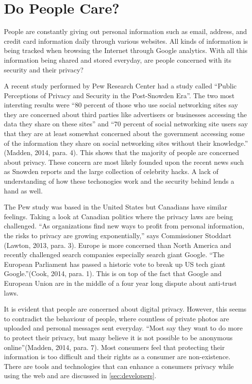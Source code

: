 \documentclass[12pt]{article}
\begin{document}
\section{Do People Care?}\label{sec:demand}

People are constantly giving out personal information such as email, address, and credit card information daily through various websites. All kinds of information is being tracked when browsing the Internet through Google analytics. With all this information being shared and stored everyday, are people concerned with its security and their privacy?

A recent study performed by Pew Research Center had a study called ``Public Perceptions of Privacy and Security in the Post-Snowden Era''. The two most intersting results were ``80 percent of those who use social networking sites say they are concerned about third parties like advertisers or businesses accessing the data they share on these sites'' and ``70 percent of social networking site users say that they are at least somewhat concerned about the government accessing some of the information they share on social networking sites without their knowledge.'' (Madden, 2014, para. 4). This shows that the majority of people are concerned about privacy. These concern are most likely founded upon the recent news such as Snowden reports and the large collection of celebrity hacks. A lack of understanding of how these techonogies work and the security behind lends a hand as well.

The Pew study was based in the United States but Canadians have similar feelings. Taking a look at Canadian politics where the privacy laws are being challenged. ``As organizations find new ways to profit from personal information, the risks to privacy are growing exponentially,'' says Commissioner Stoddart (Lawton, 2013, para. 3). Europe is more concerned than North America and recently challenged search companies especially search giant Google. ``The European Parliament has passed a historic vote to break up US tech giant Google.''(Cook, 2014, para. 1). This is on top of the fact that Google and European Union are in the middle of a four year long dispute about anti-trust laws.

It is evident that people are concerned about digital privacy. However, this seems to contradict the behaviour of people, where countless of private photos are uploaded and personal messages sent everyday. ``Most say they want to do more to protect their privacy, but many believe it is not possible to be anonymous online''(Madden, 2014, para. 7). Most consumers feel that protecting their information is too difficult and their rights as a consumer are non-existence. There are tools and technologies that can enhance a consumers privacy while using the web and are discussed in \ref{sec:developers}. 
\end{document}
